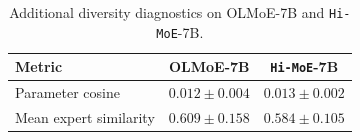 \documentclass[sigconf,nonacm]{acmart}
\begin{document}
\begin{table}[!htbp]
\centering
\caption{Additional diversity diagnostics on OLMoE-7B and \texttt{Hi-MoE}-7B.}
\label{tab:diversity_metrics}
\setlength{\tabcolsep}{8pt}
\begin{tabular}{lcc}
\toprule
\textbf{Metric} & \textbf{OLMoE-7B} & \textbf{\texttt{Hi-MoE}-7B} \\
\midrule
Parameter cosine & $0.012 \pm 0.004$ & $0.013 \pm 0.002$ \\
Mean expert similarity & $0.609 \pm 0.158$ & $\mathbf{0.584 \pm 0.105}$ \\
\bottomrule
\end{tabular}
\vspace{-4mm}
\end{table}





\end{document}
